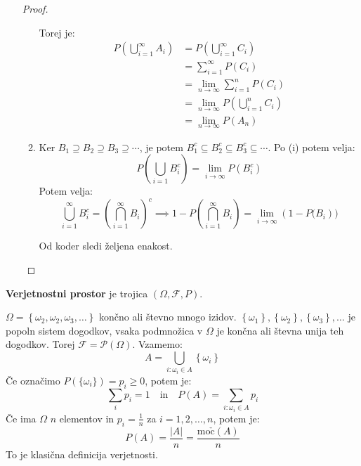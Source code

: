 \documentclass[12pt]{book}
\def\n{\noindent}
\theoremstyle{definition}
\theoremstyle{plain}
\theoremstyle{plain}
\theoremstyle{plain}
\theoremstyle{remark}
\begin{document}
\begin{enumerate}[label=(\alph*)]
\begin{proof}
\begin{enumerate}[label=(\roman*)]
            Torej je: 
            $$
            \begin{aligned} 
                P\left(\bigcup_{i=1}^{\infty} A_i \right) &= P\left(\bigcup_{i=1}^{\infty} C_i\right) \\ 
                &= \sum_{i=1}^{\infty} P(C_i) \\ &= \lim _{n \to \infty} \sum_{i=1}^{n} P(C_i) \\ 
                &= \lim _{n \to \infty} P\left(\bigcup_{i=1}^n C_i\right) \\ 
                &= \lim_{n \to \infty} P(A_n) 
            \end{aligned}
            $$ 
            \item Ker $B_1 \supseteq B_2 \supseteq B_3 \supseteq \cdots$, je potem $B_1^c \subseteq B_2^c \subseteq B_3^c \subseteq \cdots$. Po (i) potem velja:
            $$
            P\left(\bigcup_{i=1} B_i^c\right)=\lim _{i \to \infty} P\left(B_i^c\right)
            $$ 
            Potem velja: 
            $$
            \bigcup_{i=1}^{\infty} B_i^c=\left(\bigcap_{i=1}^{\infty} B_i\right)^c \implies 1-P\left(\bigcap_{i=1}^{\infty} B_i\right)=\lim_{i \to \infty}\left(1-P(B_i\right)) 
            $$
            
            Od koder sledi željena enakost. 
        \end{enumerate}
    \end{proof}
\end{enumerate}

\n \textbf{Verjetnostni prostor} je trojica $(\Omega, \mathcal{F}, P)$.

\begin{zgled}
    $\Omega=\left\{\omega_2, \omega_2, \omega_3, \ldots\right\}$ končno ali števno mnogo izidov. $\left\{\omega_1\right\},\left\{\omega_2\right\},\left\{\omega_3\right\}, \ldots$ je popoln sistem dogodkov, vsaka podmnožica v $\Omega$ je končna ali števna unija teh dogodkov. Torej $\mathcal{F}=\mathcal{P}(\Omega)$. Vzamemo:
    $$
    A=\bigcup_{i: \omega_i \in A}\left\{\omega_i\right\} 
    $$
    Če označimo $P(\{\omega_i\}) = p_i \geq 0$, potem je: 
    $$
    \sum_i p_i=1 \quad \text{in} \quad P(A)=\sum_{i: \omega_i \in A} p_i
    $$
    Če ima $\Omega$ $n$ elementov in $p_i = \frac{1}{n}$ za $i=1, 2, \ldots, n$, potem je:
    $$
    P(A)=\frac{|A|}{n}=\frac{\operatorname{mo\check{c}}(A)}{n}
    $$
    To je klasična definicija verjetnosti. 
\end{zgled}
\end{document}
